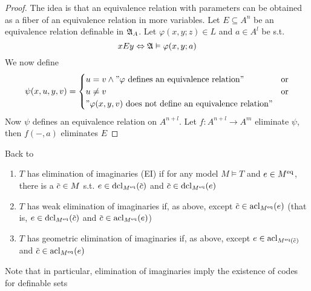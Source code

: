 \documentclass[11pt]{article}
\begin{document}
\begin{proof}
The idea is that an equivalence relation with parameters can be obtained as a fiber of an
equivalence relation in more variables. Let \(E\subseteq A^n\) be an equivalence relation definable
in \(\mathfrak{A}_A\). Let \(\varphi(x,y;z)\in L\) and \(a\in A^l\) be s.t.
\begin{equation*}
xEy\Leftrightarrow\mathfrak{A}\vDash\varphi(x,y;a)
\end{equation*}
We now define
\begin{equation*}
\psi(x,u,y,v)=
\begin{cases}
u=v\wedge"\varphi\text{ defines an equivalence relation}"&\text{or}\\
u\neq v&\text{or}\\
"\varphi(x,y,v)\text{ does not define an equivalence relation}"
\end{cases}
\end{equation*}
Now \(\psi\) defines an equivalence relation on \(A^{n+l}\). Let \(f:A^{n+l}\to A^m\) eliminate \(\psi\),
then \(f(-,a)\) eliminates \(E\)
\end{proof}

Back to \cite{PillayNoteStability}

\begin{definition}[]
\begin{enumerate}
\item \(T\) has elimination of imaginaries (EI) if for any model \(M\vDash T\) and \(e\in M^{\operatorname{eq}}\), there
is a \(\barc\in M\) s.t. \(e\in\dcl_{M^{\eq}}(\barc)\) and \(\barc\in\dcl_{M^{\eq}}(e)\)
\item \(T\) has weak elimination of imaginaries if, as above, except \(\barc\in\acl_{M^{\eq}}(e)\)
(that is, \(e\in\dcl_{M^{\eq}}(\barc)\) and \(\barc\in\acl_{M^{\eq}}(e)\))
\item \(T\) has geometric elimination of imaginaries if, as above,
except \(e\in\acl_{M^{\eq}(\barc)}\) and \(\barc\in\acl_{M^{\eq}}(e)\)
\end{enumerate}
\end{definition}

Note that in particular, elimination of imaginaries imply the existence of codes for definable sets
\end{document}
